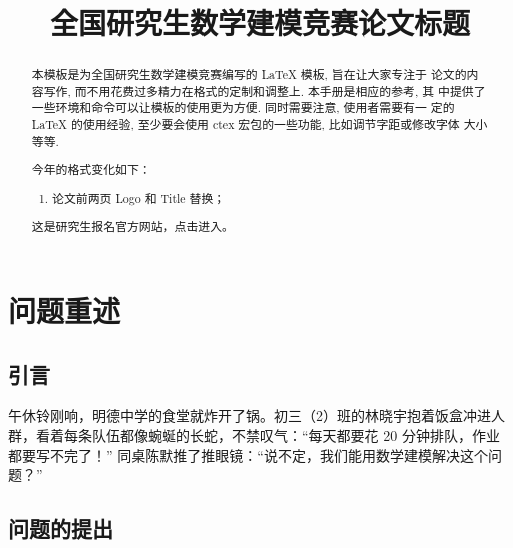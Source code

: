 \documentclass[bwprint]{gmcmthesis}
\title{全国研究生数学建模竞赛论文标题}
\begin{document}
\maketitle

\begin{abstract}
本模板是为全国研究生数学建模竞赛编写的 \LaTeX{} 模板, 旨在让大家专注于
论文的内容写作, 而不用花费过多精力在格式的定制和调整上. 本手册是相应的参考, 其
中提供了一些环境和命令可以让模板的使用更为方便. 同时需要注意, 使用者需要有一
定的 \LaTeX{} 的使用经验, 至少要会使用 ctex 宏包的一些功能, 比如调节字距或修改字体
大小等等.

\begin{mdframed}[%
roundcorner=5pt,linecolor=gray!50,outerlinewidth=0.5pt,
middlelinewidth=0.3pt,backgroundcolor=gray!2,
innertopmargin=\topskip, frametitle={2025年格式变化说明},
frametitlefont= \bfseries,frametitlerule=true,frametitlealignment =\raggedright\noindent,
frametitlerulewidth=.5pt, frametitlebackgroundcolor=gray!2,]
今年的格式变化如下：
\begin{enumerate}
\item 论文前两页 Logo 和 Title 替换；
\end{enumerate}
\end{mdframed}

这是研究生报名官方网站，点击\href{https://cpipc.acge.org.cn/}{}进入。



\end{abstract}

\pagestyle{plain}

\maketoc

\clearpage

\section{问题重述}

\subsection{引言}   %

午休铃刚响，明德中学的食堂就炸开了锅。初三（2）班的林晓宇抱着饭盒冲进人群，看着每条队伍都像蜿蜒的长蛇，不禁叹气：“每天都要花 20 分钟排队，作业都要写不完了！” 同桌陈默推了推眼镜：“说不定，我们能用数学建模解决这个问题？”


\subsection{问题的提出}
\end{document}

